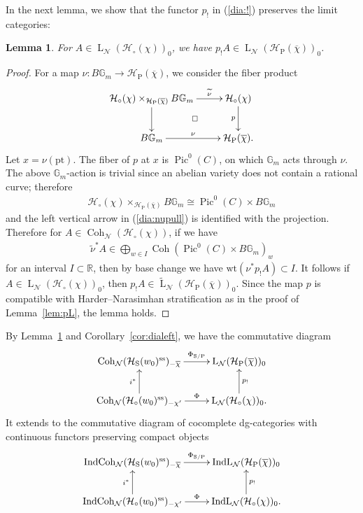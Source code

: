 \documentclass[11pt,oneside,a4paper,mathscr]{amsart}
\makeatletter
\newtheorem{lemma}[thm]{Lemma}
\theoremstyle{definition}
\newcommand{\LL}{\operatorname{L}}
\newcommand{\Pic}{\operatorname{Pic}}
\newcommand{\cH}{\mathcal{H}}
\newcommand{\bgm}{B\mathbb{G}_m}
\newcommand{\diasquare}{\ar@{}[rd]|\square}
\newcommand{\Coh}{\operatorname{Coh}}
\newcommand{\IndCoh}{\operatorname{IndCoh}}
\newcommand{\IndL}{\operatorname{IndL}}
\newcommand{\rS}{\mathrm{S}}
\newcommand{\rP}{\mathrm{P}}
\newcommand{\wt}{\mathrm{wt}}
\makeatother
\begin{document}
In the next lemma, we show that the functor $p_{!}$ in (\ref{dia:!}) preserves the limit categories: 
\begin{lemma}\label{lem:p!L}
For $A\in \LL_{\mathcal{N}}(\cH_{\circ}(\chi))_0$, we have 
$p_{!}A \in \LL_{\mathcal{N}}(\cH_{\mathrm{P}}(\overline{\chi}))_0$.
\end{lemma}
\begin{proof}
For a map $\nu \colon \bgm \to \cH_{\mathrm{P}}(\overline{\chi})$, we consider the fiber 
product 
\begin{align*}
    \xymatrix{
\cH_{\circ}(\chi)\times_{\cH_{\mathrm{P}}(\overline{\chi})}\bgm \ar[r]^-{\widetilde{\nu}} \ar[d] \diasquare & 
\cH_{\circ}(\chi) \ar[d]_-{p} \\
\bgm \ar[r]^-{\nu} & \cH_{\mathrm{P}}(\overline{\chi}).
    }
\end{align*}
Let $x=\nu(\mathrm{pt})$. 
The fiber of $p$ at $x$ is $\Pic^0(C)$, on which $\mathbb{G}_m$ acts 
through $\nu$. The above $\mathbb{G}_m$-action is trivial since 
an abelian variety does not contain a rational curve; therefore 
\begin{align}\label{dia:nupull}
    \cH_{\circ}(\chi)\times_{\cH_{\mathrm{P}}(\overline{\chi})}\bgm\cong \Pic^0(C)\times \bgm
\end{align}
and the left vertical arrow in (\ref{dia:nupull}) is identified with the projection. 
Therefore for $A \in \Coh_{\mathcal{N}}(\cH_{\circ}(\chi))$, if 
we have 
\begin{align*}
    \widetilde{\nu}^* A \in \bigoplus_{w\in I}\Coh(\Pic^0(C)\times \bgm)_{w}
\end{align*}
for an interval $I\subset \mathbb{R}$, then by base change we have 
$\wt(\nu^*p_{!}A) \subset I$. 
It follows if $A \in \LL_{\mathcal{N}}(\cH_{\circ}(\chi))_0$, then 
$p_{!}A \in \widetilde{\LL}_{\mathcal{N}}(\cH_{\rP}(\overline{\chi}))_0$. 
Since the map $p$ is compatible with Harder--Narasimhan stratification as in the proof of Lemma~\ref{lem:pL}, the lemma holds. 
\end{proof}



By Lemma~\ref{lem:p!L} and Corollary~\ref{cor:dialeft}, we have the commutative diagram
\begin{align}\label{dia:pL}
\xymatrix{
\Coh_{\mathcal{N}}(\cH_{\rS}(w_0)^{\mathrm{ss}})_{-\overline{\chi}}
\ar[r]^-{\Phi_{\rS/\rP}}
&
\LL_{\mathcal{N}}(\cH_{\mathrm{P}}(\overline{\chi}))_0
\\
\Coh_{\mathcal{N}}(\cH_{\circ}(w_0)^{\mathrm{ss}})_{-\chi'}
\ar[r]^-{\Phi}
\ar[u]^-{i^*}
&
\LL_{\mathcal{N}}(\cH_{\circ}(\chi))_0
\ar[u]_-{p_{!}} .
}
\end{align}
It extends to the commutative diagram of cocomplete dg-categories with continuous functors preserving compact objects
\begin{align}\label{dia:pL2}
\xymatrix{
\IndCoh_{\mathcal{N}}(\cH_{\rS}(w_0)^{\mathrm{ss}})_{-\overline{\chi}}
\ar[r]^-{\Phi_{\rS/\rP}}
&
\IndL_{\mathcal{N}}(\cH_{\mathrm{P}}(\overline{\chi}))_0
\\
\IndCoh_{\mathcal{N}}(\cH_{\circ}(w_0)^{\mathrm{ss}})_{-\chi'}
\ar[r]^-{\Phi}
\ar[u]^-{i^*}
&
\IndL_{\mathcal{N}}(\cH_{\circ}(\chi))_0
\ar[u]_-{p_{!}} .
}
\end{align}
\end{document}
